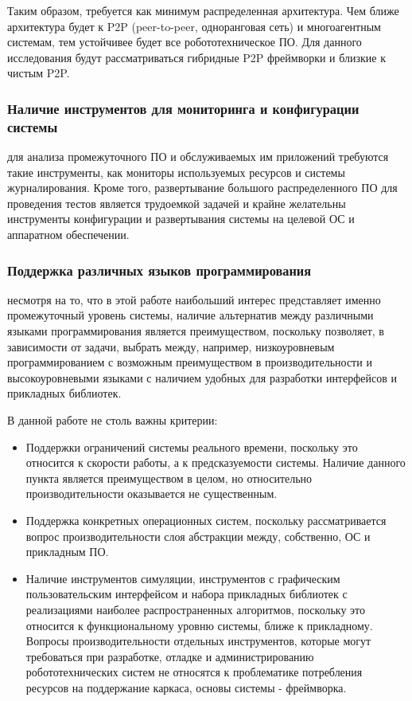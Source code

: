 Таким образом, требуется как минимум распределенная архитектура. Чем ближе архитектура будет к P2P (peer-to-peer, одноранговая сеть) и многоагентным системам, тем устойчивее будет все робототехническое ПО. Для данного исследования будут рассматриваться гибридные P2P фреймворки и близкие к чистым P2P.

\subsubsection{Наличие инструментов для мониторинга и конфигурации системы} для анализа промежуточного ПО и обслуживаемых им приложений требуются такие инструменты, как мониторы используемых ресурсов и системы журналирования. Кроме того, развертывание большого распределенного ПО для проведения тестов является трудоемкой задачей и крайне желательны инструменты конфигурации и развертывания системы на целевой ОС и аппаратном обеспечении.

\subsubsection{Поддержка различных языков программирования} несмотря на то, что в этой работе наибольший интерес представляет именно промежуточный уровень системы, наличие альтернатив между различными языками программирования является преимуществом, поскольку позволяет, в зависимости от задачи, выбрать между, например, низкоуровневым программированием с возможным преимуществом в производительности и высокоуровневыми языками с наличием удобных для разработки интерфейсов и прикладных библиотек.

В данной работе не столь важны критерии:
\begin{itemize}
	\item Поддержки ограничений системы реального времени, поскольку это относится к скорости работы, а к предсказуемости системы. Наличие данного пункта является преимуществом в целом, но относительно производительности оказывается не существенным.
	\item Поддержка конкретных операционных систем, поскольку рассматривается вопрос производительности слоя абстракции между, собственно, ОС и прикладным ПО.
	\item Наличие инструментов симуляции, инструментов с графическим пользовательским интерфейсом и набора прикладных библиотек с реализациями наиболее распространенных алгоритмов, поскольку это относится к функциональному уровню системы, ближе к прикладному. Вопросы производительности отдельных инструментов, которые могут требоваться при разработке, отладке и администрированию робототехнических систем не относятся к проблематике потребления ресурсов на поддержание каркаса, основы системы - фреймворка.
\end{itemize}


